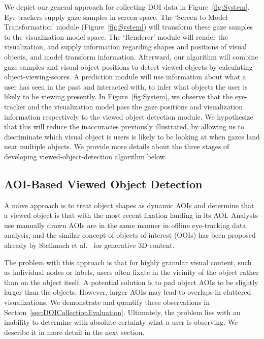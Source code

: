 We depict our general approach for collecting DOI data in Figure~\ref{fig:System}. Eye-trackers supply gaze samples in screen space. The `Screen to Model Transformation' module (Figure~\ref{fig:System}) will transform these gaze samples to the visualization model space. The `Renderer' module will render the visualization, and supply information regarding shapes and positions of visual objects, and model transform information. Afterward, our algorithm will combine gaze samples and visual object positions to detect viewed objects by calculating object-viewing-scores. A prediction module will use information about what a user has seen in the past and interacted with, to infer what objects the user is likely to be viewing presently. In Figure~\ref{fig:System}, we observe that the eye-tracker and the visualization model pass the gaze positions and visualization information respectively to the viewed object detection module. We hypothesize that this will reduce the inaccuracies previously illustrated, by allowing us to discriminate which visual object is users is likely to be looking at when gazes land near multiple objects.
We provide more details about the three stages of developing viewed-object-detection algorithm below. 

\subsection{AOI-Based Viewed Object Detection}
\label{sec:AOIBasedViewedObjectDetection}

A na\"{\i}ve approach is to treat object shapes as dynamic AOIs and determine that a viewed object is that with the most recent fixation landing in its AOI. Analysts use manually drawn AOIs are in the same manner in offline eye-tracking data analysis, and the similar concept of objects of interest (OOIs) has been proposed already by Stellmach et al.~\cite{Ste10} for generative 3D content.

The problem with this approach is that for highly granular visual content, such as individual nodes or labels, users often fixate in the vicinity of the object rather than on the object itself. A potential solution is to pad object AOIs to be slightly larger than the objects. However, larger AOIs may lead to overlaps in cluttered visualizations. We demonstrate and quantify these observations in Section~\ref{sec:DOICollectionEvaluation}. Ultimately, the problem lies with an inability to determine with absolute certainty what a user is observing. We describe it in more detail in the next section.

